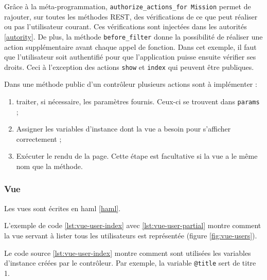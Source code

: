 \begin{figure}
\end{figure}

Grâce à la méta-programmation, \lstinline[language=Rails]{authorize_actions_for Mission} permet de rajouter, sur toutes les méthodes REST, des vérifications de ce que peut réaliser ou pas l'utilisateur courant. Ces vérifications sont injectées dans les autorités \ref{autority}. De plus, la méthode \lstinline[language=Rails]{before_filter} donne la possibilité de réaliser une action supplémentaire avant chaque appel de fonction. Dans cet exemple, il faut que l'utilisateur soit authentifié pour que l'application puisse ensuite vérifier ses droits. Ceci à l'exception des actions \texttt{show} et \texttt{index} qui peuvent être publiques.

Dans une méthode public d'un contrôleur plusieurs actions sont à implémenter :
\begin{enumerate}
  \item traiter, si nécessaire, les paramètres fournis. Ceux-ci se trouvent dans \lstinline[language=Rails]{params} ;
  \item Assigner les variables d'instance dont la vue a besoin pour s'afficher correctement ;
  \item Exécuter le rendu de la page. Cette étape est facultative si la vue a le même nom que la méthode.
\end{enumerate}

\subsubsection{Vue}
\label{vues}
Les vues sont écrites en haml \ref{haml}.

L'exemple de code \ref{lst:vue-user-index} avec \ref{lst:vue-user-partial} montre comment la vue servant à lister tous les utilisateurs est représentée (figure \ref{fig:vue-users}).

\begin{figure}

\end{figure}

Le code source \ref{lst:vue-user-index} montre comment sont utilisées les variables d'instance créées par le contrôleur. Par exemple, la variable \texttt{@title} sert de titre 1.

